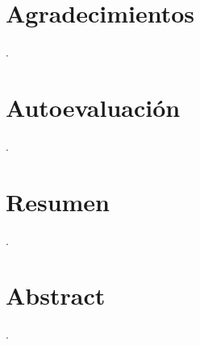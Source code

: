 \documentclass[twoside,a4paper,12pt,onecolumn,openany]{book}
\begin{document}



\chapter*{Agradecimientos}
\thispagestyle{empty}

.





\chapter*{Autoevaluación}
\thispagestyle{empty}
.




\chapter*{Resumen}
\thispagestyle{empty}

.






\chapter*{Abstract}
\thispagestyle{empty}

.


\tableofcontents
\newpage
\renewcommand{\listfigurename}{Índice de Figuras}

\listoffigures 
\newpage

\newpage

\listoftables %

\newpage



\end{document}
